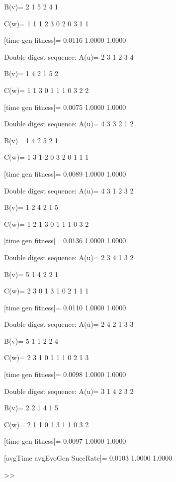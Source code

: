 B(v)=
     2     1     5     2     4     1

C(w)=
     1     1     1     2     3     0     2     0     3     1     1

[time gen fitness]=
    0.0116    1.0000    1.0000

Double digest sequence:
A(u)=
     2     3     1     2     3     4

B(v)=
     1     4     2     1     5     2

C(w)=
     1     1     3     0     1     1     1     0     3     2     2

[time gen fitness]=
    0.0075    1.0000    1.0000

Double digest sequence:
A(u)=
     4     3     3     2     1     2

B(v)=
     1     4     2     5     2     1

C(w)=
     1     3     1     2     0     3     2     0     1     1     1

[time gen fitness]=
    0.0089    1.0000    1.0000

Double digest sequence:
A(u)=
     4     3     1     2     3     2

B(v)=
     1     2     4     2     1     5

C(w)=
     1     2     1     3     0     1     1     1     0     3     2

[time gen fitness]=
    0.0136    1.0000    1.0000

Double digest sequence:
A(u)=
     2     3     4     1     3     2

B(v)=
     5     1     4     2     2     1

C(w)=
     2     3     0     1     3     1     0     2     1     1     1

[time gen fitness]=
    0.0110    1.0000    1.0000

Double digest sequence:
A(u)=
     2     4     2     1     3     3

B(v)=
     5     1     1     2     2     4

C(w)=
     2     3     1     0     1     1     1     0     2     1     3

[time gen fitness]=
    0.0098    1.0000    1.0000

Double digest sequence:
A(u)=
     3     1     4     2     3     2

B(v)=
     2     2     1     4     1     5

C(w)=
     2     1     1     0     1     3     1     1     0     3     2

[time gen fitness]=
    0.0097    1.0000    1.0000

[avgTime  avgEvoGen  SuccRate]=
    0.0103    1.0000    1.0000

>> 